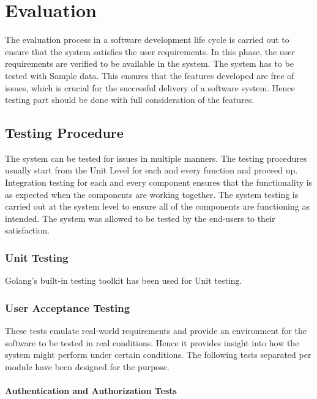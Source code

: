 \documentclass[12pt,a4paper]{report}
\begin{document}
\chapter{Evaluation}

The evaluation process in a software development life cycle is carried out to ensure that the system satisfies the user requirements. In this phase, the user requirements are verified to be available in the system. The system has to be tested with Sample data. This ensures that the features developed are free of issues, which is crucial for the successful delivery of a software system. Hence testing part should be done with full consideration of the features.

\section{Testing Procedure}
The system can be tested for issues in multiple manners. The testing procedures usually start from the Unit Level for each and every function and proceed up. Integration testing for each and every component ensures that the functionality is as expected when the components are working together. The system testing is carried out at the system level to ensure all of the components are functioning as intended. The system was allowed to be tested by the end-users to their satisfaction.

\subsection*{Unit Testing}

Golang's built-in testing toolkit has been used for Unit testing.

\subsection*{User Acceptance Testing}

These tests emulate real-world requirements and provide an environment for the software to be tested in real conditions. Hence it provides insight into how the system might perform under certain conditions. The following tests separated per module have been designed for the purpose.

\subsubsection*{Authentication and Authorization Tests}

\renewcommand{\cellalign}{l}
\end{document}
